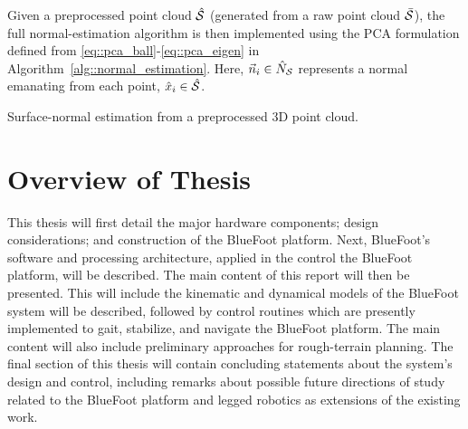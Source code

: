 		Given a preprocessed point cloud $\hat{{\cal S}}$ (generated from a raw point cloud $\bar{{\cal S}}$), the full normal-estimation algorithm is then implemented using the PCA formulation defined from \ref{eq::pca_ball}-\ref{eq::pca_eigen} in Algorithm~\ref{alg::normal_estimation}. Here, $\vec{n}_{i} \in \hat{N}_{{\cal S}}$ represents a normal emanating from each \Ith point, $\hat{x}_{i} \in \hat{{\cal S}}$.

			\begin{algorithm}[!h]
				\begin{algorithmic}
				\EndFor
				\end{algorithmic}
				\caption{Surface-normal estimation from a preprocessed 3D point cloud.}
				\label{alg::normal_estimation}
			\end{algorithm}
		

	\section{Overview of Thesis}

		This thesis will first detail the major hardware components; design considerations; and construction of the BlueFoot platform. Next, BlueFoot's software and processing architecture, applied in the control the BlueFoot platform, will be described. The main content of this report will then be presented. This will include the kinematic and dynamical models of the BlueFoot system will be described, followed by control routines which are presently implemented to gait, stabilize, and navigate the BlueFoot platform. The main content will also include preliminary approaches for rough-terrain planning. The final section of this thesis will contain concluding statements about the system's design and control, including remarks about possible future directions of study related to the BlueFoot platform and legged robotics as extensions of the existing work.
